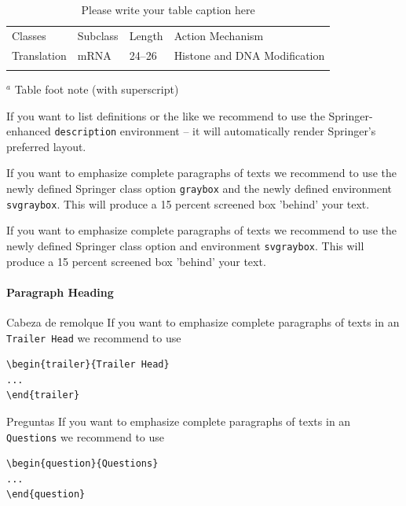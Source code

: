 


\begin{table}[!t]
\caption{Please write your table caption here}
\label{tab:1}       %
%
%
\begin{tabular}{p{2cm}p{2.4cm}p{2cm}p{4.9cm}}
\hline\noalign{\smallskip}
Classes & Subclass & Length & Action Mechanism  \\
\noalign{\smallskip}\svhline\noalign{\smallskip}
Translation & mRNA  & 24--26 & Histone and DNA Modification\\
\noalign{\smallskip}\hline\noalign{\smallskip}
\end{tabular}
$^a$ Table foot note (with superscript)
\end{table}
If you want to list definitions or the like we recommend to use the Springer-enhanced \verb|description| environment -- it will automatically render Springer's preferred layout.

\begin{svgraybox}
If you want to emphasize complete paragraphs of texts we recommend to use the newly defined Springer class option \verb|graybox| and the newly defined environment \verb|svgraybox|. This will produce a 15 percent screened box 'behind' your text.

If you want to emphasize complete paragraphs of texts we recommend to use the newly defined Springer class option and environment \verb|svgraybox|. This will produce a 15 percent screened box 'behind' your text.
\end{svgraybox}

\paragraph{Paragraph Heading}

\begin{trailer}{Cabeza de remolque}
If you want to emphasize complete paragraphs of texts in an \verb|Trailer Head| we recommend to
use  \begin{verbatim}\begin{trailer}{Trailer Head}
...
\end{trailer}\end{verbatim}
\end{trailer}
%
\begin{question}{Preguntas}
If you want to emphasize complete paragraphs of texts in an \verb|Questions| we recommend to
use  \begin{verbatim}\begin{question}{Questions}
...
\end{question}\end{verbatim}
\end{question}

